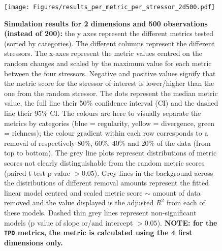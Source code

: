 \documentclass[12pt,letterpaper]{article}
\begin{document}
\begin{figure}[!htbp]
\centering
   \texttt{[image: Figures/results\_per\_metric\_per\_stressor\_2d500.pdf]}
\caption{\scriptsize{\textbf{Simulation results for 2 dimensions and 500 observations (instead of 200):} the y axes represent the different metrics tested (sorted by categories).
The different columns represent the different stressors. The x-axes represent the metric values centred on the random changes and scaled by the maximum value for each metric between the four stressors.
Negative and positive values signify that the metric score for the stressor of interest is lower/higher than the one from the random stressor.
The dots represent the median metric value, the full line their 50\% confidence interval (CI) and the dashed line their 95\% CI.
The colours are here to visually separate the metrics by categories (blue = regularity, yellow = divergence, green = richness); the colour gradient within each row corresponds to a removal of respectively 80\%, 60\%, 40\% and 20\% of the data (from top to bottom).
The grey line plots represent distributions of metric scores not clearly distinguishable from the random metric scores (paired t-test p value $> 0.05$).
Grey lines in the background across the distributions of different removal amounts represent the fitted linear model centred and scaled metric score $\sim$ amount of data removed and the value displayed is the adjusted $R^2$ from each of these models.
Dashed thin grey lines represent non-significant models (p value of slope or/and intercept $> 0.05$).
\textbf{NOTE: for the \texttt{TPD} metrics, the metric is calculated using the 4 first dimensions only.}
}}
\label{Fig:simulation_results_2d500}
\end{figure}
\bigskip
\end{document}
